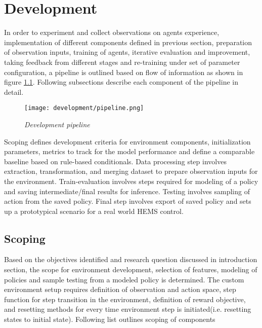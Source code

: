 

\chapter{Development} \label{ch-3}

\begin{large}
	
In order to experiment and collect observations on agents experience, implementation of different components defined in previous section, preparation of observation inputs, training of agents, iterative evaluation and improvement, taking feedback from different stages and re-training under set of parameter configuration, a pipeline is outlined based on flow of information as shown in figure \ref{fig:dev_pipeline}. Following subsections describe each component of the pipeline in detail.


\begin{figure}[h]
	\begin{center}
		\texttt{[image: development/pipeline.png]}
		\caption{ \textit{Development pipeline} }
		\label{fig:dev_pipeline}
	\end{center}
\end{figure}

Scoping defines development criteria for environment components, initialization parameters, metrics to track for the model performance and define a comparable baseline based on rule-based conditionals. Data processing step involves extraction, transformation, and merging dataset to prepare observation inputs for the environment. Train-evaluation involves steps required for modeling of a policy and saving intermediate/final results for inference. Testing involves sampling of action from the saved policy. Final step involves export of saved policy and sets up a prototypical scenario for a real world HEMS control.

\section{Scoping}

Based on the objectives identified and research question discussed in introduction section, the scope for environment development, selection of features, modeling of policies and sample testing from a modeled policy is determined. The custom environment setup requires definition of observation and action space, step function for step transition in the environment, definition of reward objective, and resetting methods for every time environment step is initiated(i.e. resetting states to initial state). Following list outlines scoping of components \\


\end{large}
